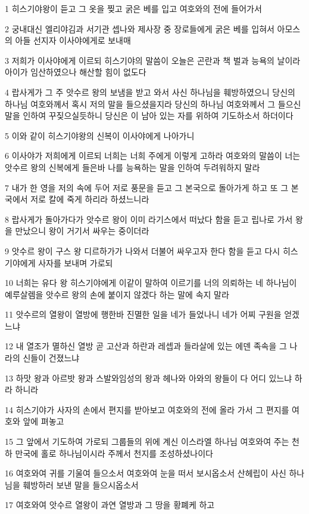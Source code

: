 \par 1 히스기야왕이 듣고 그 옷을 찢고 굵은 베를 입고 여호와의 전에 들어가서
\par 2 궁내대신 엘리야김과 서기관 셉나와 제사장 중 장로들에게 굵은 베를 입혀서 아모스의 아들 선지자 이사야에게로 보내매
\par 3 저희가 이사야에게 이르되 히스기야의 말씀이 오늘은 곤란과 책 벌과 능욕의 날이라 아이가 임산하였으나 해산할 힘이 없도다
\par 4 랍사게가 그 주 앗수르 왕의 보냄을 받고 와서 사신 하나님을 훼방하였으니 당신의 하나님 여호와께서 혹시 저의 말을 들으셨을지라 당신의 하나님 여호와께서 그 들으신 말을 인하여 꾸짖으실듯하니 당신은 이 남아 있는 자를 위하여 기도하소서 하더이다
\par 5 이와 같이 히스기야왕의 신복이 이사야에게 나아가니
\par 6 이사야가 저희에게 이르되 너희는 너희 주에게 이렇게 고하라 여호와의 말씀이 너는 앗수르 왕의 신복에게 들은바 나를 능욕하는 말을 인하여 두려워하지 말라
\par 7 내가 한 영을 저의 속에 두어 저로 풍문을 듣고 그 본국으로 돌아가게 하고 또 그 본국에서 저로 칼에 죽게 하리라 하셨느니라
\par 8 랍사게가 돌아가다가 앗수르 왕이 이미 라기스에서 떠났다 함을 듣고 립나로 가서 왕을 만났으니 왕이 거기서 싸우는 중이더라
\par 9 앗수르 왕이 구스 왕 디르하가가 나와서 더불어 싸우고자 한다 함을 듣고 다시 히스기야에게 사자를 보내며 가로되
\par 10 너희는 유다 왕 히스기야에게 이같이 말하여 이르기를 너의 의뢰하는 네 하나님이 예루살렘을 앗수르 왕의 손에 붙이지 않겠다 하는 말에 속지 말라
\par 11 앗수르의 열왕이 열방에 행한바 진멸한 일을 네가 들었나니 네가 어찌 구원을 얻겠느냐
\par 12 내 열조가 멸하신 열방 곧 고산과 하란과 레셉과 들라살에 있는 에덴 족속을 그 나라의 신들이 건졌느냐
\par 13 하맛 왕과 아르밧 왕과 스발와임성의 왕과 헤나와 아와의 왕들이 다 어디 있느냐 하라 하니라
\par 14 히스기야가 사자의 손에서 편지를 받아보고 여호와의 전에 올라 가서 그 편지를 여호와 앞에 펴놓고
\par 15 그 앞에서 기도하여 가로되 그룹들의 위에 계신 이스라엘 하나님 여호와여 주는 천하 만국에 홀로 하나님이시라 주께서 천지를 조성하셨나이다
\par 16 여호와여 귀를 기울여 들으소서 여호와여 눈을 떠서 보시옵소서 산헤립이 사신 하나님을 훼방하러 보낸 말을 들으시옵소서
\par 17 여호와여 앗수르 열왕이 과연 열방과 그 땅을 황폐케 하고
